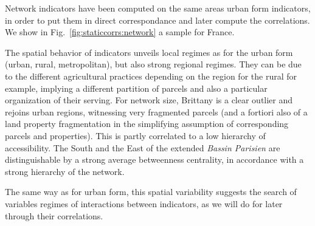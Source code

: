 Network indicators have been computed on the same areas  urban form indicators, in order to put them in direct correspondance and later compute the correlations. We show in Fig.~\ref{fig:staticcorrs:network} a sample for France.

The spatial behavior of indicators unveils local regimes as for the urban form (urban, rural, metropolitan), but also strong regional regimes. They can be due to the different agricultural practices depending on the region for the rural for example, implying a different partition of parcels and also a particular organization of their serving. For network size, Brittany is a clear outlier and rejoins urban regions, witnessing very fragmented parcels (and a fortiori also of a land property fragmentation in the simplifying assumption of corresponding parcels and properties). This is partly correlated to a low hierarchy of accessibility. The South and the East of the extended \emph{Bassin Parisien} are distinguishable by a strong average betweenness centrality, in accordance with a strong hierarchy of the network.

The same way as for urban form, this spatial variability suggests the search of variables regimes of interactions between indicators, as we will do for later through their correlations.





